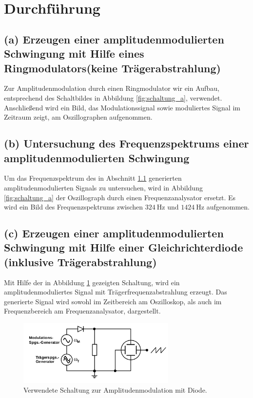 \section{Durchführung}
\label{sec:Durchführung}

\subsection{(a) Erzeugen einer amplitudenmodulierten Schwingung mit
Hilfe eines Ringmodulators(keine Trägerabstrahlung)}
\label{subsec:durchfuehrung_a}
Zur Amplitudenmodulation durch einen Ringmodulator wir ein Aufbau,
entsprechend des Schaltbildes in Abbildung \ref{fig:schaltung_a}, verwendet.
Anschließend wird ein Bild, das Modulationssignal sowie moduliertes
Signal im Zeitraum zeigt, am Oszillographen aufgenommen.
% 


\subsection{(b) Untersuchung des Frequenzspektrums einer
amplitudenmodulierten Schwingung}
\label{subsec:durchfuehrung_b}
Um das Frequenzspektrum des in Abschnitt \ref{subsec:durchfuehrung_a} generierten
amplitudenmodulierten Signals zu untersuchen, wird in Abbildung
\ref{fig:schaltung_a} der Oszillograph durch einen Frequenzanalysator ersetzt.
Es wird ein Bild des Frequenzspektrums zwischen $\SI{324}{\hertz}$ und $\SI{1424}{\hertz}$
aufgenommen.


\subsection{(c) Erzeugen einer amplitudenmodulierten Schwingung
mit Hilfe einer Gleichrichterdiode (inklusive Trägerabstrahlung)}
\label{subsec:durchfuehrung_c}
Mit Hilfe der in Abbildung \ref{fig:schaltung_c} gezeigten Schaltung,
wird ein amplitudenmoduliertes Signal mit Trägerfrequenzabstrahlung erzeugt.
Das generierte Signal wird sowohl im Zeitbereich am Oszilloskop, als auch
im Frequenzbereich am Frequenzanalysator, dargestellt.

\begin{figure}
  \centering
  \includegraphics[width=0.7\textwidth]{figures/c_d.png}
  \caption{Verwendete Schaltung zur Amplitudenmodulation mit Diode.\cite{sample}}
  \label{fig:schaltung_c}
\end{figure}


